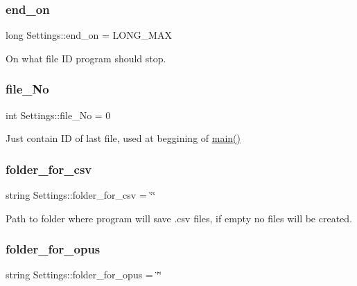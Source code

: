 \subsubsection{\texorpdfstring{end\+\_\+on}{end\_on}}
{\footnotesize\ttfamily long Settings\+::end\+\_\+on = L\+O\+N\+G\+\_\+\+M\+AX}



On what file ID program should stop. 

\mbox{\label{class_settings_abf56e843b1b674afe39d285d0ff5778f}} 
\subsubsection{\texorpdfstring{file\+\_\+\+No}{file\_No}}
{\footnotesize\ttfamily int Settings\+::file\+\_\+\+No = 0}



Just contain ID of last file, used at beggining of \hyperlink{_get_mic_8cpp_a3c04138a5bfe5d72780bb7e82a18e627}{main()} 

\mbox{\label{class_settings_a3dd40bbe4be23e6e9531ccb2db16a41a}} 
\subsubsection{\texorpdfstring{folder\+\_\+for\+\_\+csv}{folder\_for\_csv}}
{\footnotesize\ttfamily string Settings\+::folder\+\_\+for\+\_\+csv = \char`\"{}\char`\"{}}



Path to folder where program will save .csv files, if empty no files will be created. 

\mbox{\label{class_settings_a37d88dd80178efec8d6146088db70921}} 
\subsubsection{\texorpdfstring{folder\+\_\+for\+\_\+opus}{folder\_for\_opus}}
{\footnotesize\ttfamily string Settings\+::folder\+\_\+for\+\_\+opus = \char`\"{}\char`\"{}}




